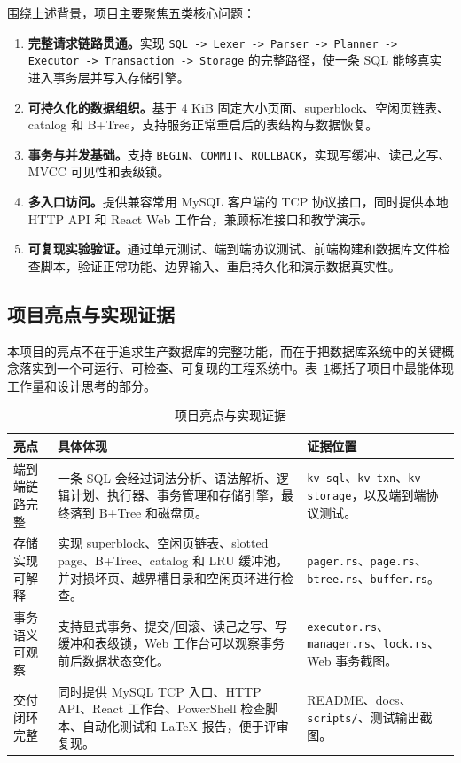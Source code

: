 \documentclass[UTF8,a4paper,12pt]{ctexart}
\newcommand{\code}[1]{\texttt{#1}}
\begin{document}
围绕上述背景，项目主要聚焦五类核心问题：

\begin{enumerate}[label=\arabic*.]
\item \textbf{完整请求链路贯通。}实现 \code{SQL -> Lexer -> Parser -> Planner -> Executor -> Transaction -> Storage} 的完整路径，使一条 SQL 能够真实进入事务层并写入存储引擎。
\item \textbf{可持久化的数据组织。}基于 4 KiB 固定大小页面、superblock、空闲页链表、catalog 和 B+Tree，支持服务正常重启后的表结构与数据恢复。
\item \textbf{事务与并发基础。}支持 \code{BEGIN}、\code{COMMIT}、\code{ROLLBACK}，实现写缓冲、读己之写、MVCC 可见性和表级锁。
\item \textbf{多入口访问。}提供兼容常用 MySQL 客户端的 TCP 协议接口，同时提供本地 HTTP API 和 React Web 工作台，兼顾标准接口和教学演示。
\item \textbf{可复现实验验证。}通过单元测试、端到端协议测试、前端构建和数据库文件检查脚本，验证正常功能、边界输入、重启持久化和演示数据真实性。
\end{enumerate}

\subsection{项目亮点与实现证据}

本项目的亮点不在于追求生产数据库的完整功能，而在于把数据库系统中的关键概念落实到一个可运行、可检查、可复现的工程系统中。表~\ref{tab:highlights}概括了项目中最能体现工作量和设计思考的部分。

\begin{table}[H]
\centering
\caption{项目亮点与实现证据}
\label{tab:highlights}
\small
\begin{tabularx}{\textwidth}{p{3.0cm}X X}
\toprule
亮点 & 具体体现 & 证据位置\\
\midrule
端到端链路完整 & 一条 SQL 会经过词法分析、语法解析、逻辑计划、执行器、事务管理和存储引擎，最终落到 B+Tree 和磁盘页。 & \code{kv-sql}、\code{kv-txn}、\code{kv-storage}，以及端到端协议测试。\\
存储实现可解释 & 实现 superblock、空闲页链表、slotted page、B+Tree、catalog 和 LRU 缓冲池，并对损坏页、越界槽目录和空闲页环进行检查。 & \code{pager.rs}、\code{page.rs}、\code{btree.rs}、\code{buffer.rs}。\\
事务语义可观察 & 支持显式事务、提交/回滚、读己之写、写缓冲和表级锁，Web 工作台可以观察事务前后数据状态变化。 & \code{executor.rs}、\code{manager.rs}、\code{lock.rs}、Web 事务截图。\\
交付闭环完整 & 同时提供 MySQL TCP 入口、HTTP API、React 工作台、PowerShell 检查脚本、自动化测试和 LaTeX 报告，便于评审复现。 & README、docs、\code{scripts/}、测试输出截图。\\
\bottomrule
\end{tabularx}
\normalsize
\end{table}
\end{document}
